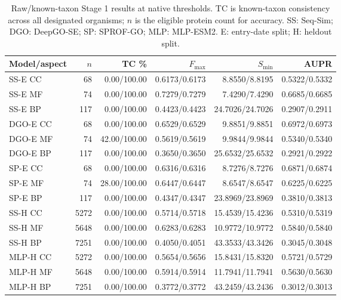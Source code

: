 \begin{table}[t]
\centering\small
\caption{Raw/known-taxon Stage 1 results at native thresholds. TC is known-taxon consistency across all designated organisms; $n$ is the eligible protein count for accuracy. SS: Seq-Sim; DGO: DeepGO-SE; SP: SPROF-GO; MLP: MLP-ESM2. E: entry-date split; H: heldout split.}
\label{tab:main-metrics}
\setlength{\tabcolsep}{4pt}
\begin{tabular}{lrrrrr}
\toprule
Model/aspect & $n$ & TC \% & $F_{\max}$ & $S_{\min}$ & AUPR \\
\midrule
SS-E CC & 68 & 0.00/100.00 & 0.6173/0.6173 & 8.8550/8.8195 & 0.5322/0.5332 \\
SS-E MF & 74 & 0.00/100.00 & 0.7279/0.7279 & 7.4290/7.4290 & 0.6685/0.6685 \\
SS-E BP & 117 & 0.00/100.00 & 0.4423/0.4423 & 24.7026/24.7026 & 0.2907/0.2911 \\
DGO-E CC & 68 & 0.00/100.00 & 0.6529/0.6529 & 9.8851/9.8851 & 0.6972/0.6973 \\
DGO-E MF & 74 & 42.00/100.00 & 0.5619/0.5619 & 9.9844/9.9844 & 0.5340/0.5340 \\
DGO-E BP & 117 & 0.00/100.00 & 0.3650/0.3650 & 25.6532/25.6532 & 0.2921/0.2922 \\
SP-E CC & 68 & 0.00/100.00 & 0.6316/0.6316 & 8.7276/8.7276 & 0.6871/0.6874 \\
SP-E MF & 74 & 28.00/100.00 & 0.6447/0.6447 & 8.6547/8.6547 & 0.6225/0.6225 \\
SP-E BP & 117 & 0.00/100.00 & 0.4347/0.4347 & 23.8969/23.8969 & 0.3810/0.3813 \\
SS-H CC & 5272 & 0.00/100.00 & 0.5714/0.5718 & 15.4539/15.4236 & 0.5310/0.5319 \\
SS-H MF & 5648 & 0.00/100.00 & 0.6283/0.6283 & 10.9772/10.9772 & 0.5840/0.5840 \\
SS-H BP & 7251 & 0.00/100.00 & 0.4050/0.4051 & 43.3533/43.3426 & 0.3045/0.3048 \\
MLP-H CC & 5272 & 0.00/100.00 & 0.5654/0.5656 & 15.8431/15.8320 & 0.5721/0.5729 \\
MLP-H MF & 5648 & 0.00/100.00 & 0.5914/0.5914 & 11.7941/11.7941 & 0.5630/0.5630 \\
MLP-H BP & 7251 & 0.00/100.00 & 0.3772/0.3772 & 43.2459/43.2436 & 0.3012/0.3013 \\
\bottomrule
\end{tabular}
\end{table}
